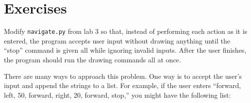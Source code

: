 \documentclass[11pt]{cselabheader}
\begin{document}

\newpage
\section{Exercises}\label{exercises}


\begin{ex}[navigate2.py] Modify \texttt{navigate.py} from lab 3 so
  that, instead of performing each action as it is entered, the
  program accepts user input without drawing anything until the ``stop''
  command is given all while ignoring invalid inputs.  After the user
  finishes, the program should run the drawing commands all at once.

  There are many ways to approach this problem.
  One way is to accept the user's input and append the strings to a list.
  For example, if the user enters ``forward, left, 50, forward, right, 20, forward, stop,''
  you might have the following list:
  \begin{python3code}
  \end{python3code}
\end{ex}
\end{document}
